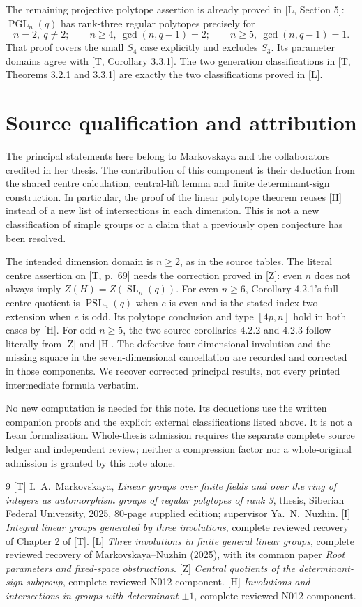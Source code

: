 \documentclass[11pt,a4paper]{article}
\newcommand{\SL}{\operatorname{SL}}
\newcommand{\PGL}{\operatorname{PGL}}
\newcommand{\PSL}{\operatorname{PSL}}
\begin{document}
The remaining projective polytope assertion is already proved in
[L, Section 5]: $\PGL_n(q)$ has rank-three regular polytopes precisely
for
\[
 n=2,\ q\ne2;\qquad n\ge4,\ \gcd(n,q-1)=2;
 \qquad n\ge5,\ \gcd(n,q-1)=1.
\]
That proof covers the small $S_4$ case explicitly and excludes $S_3$.
Its parameter domains agree with [T, Corollary 3.3.1]. The two
generation classifications in [T, Theorems 3.2.1 and 3.3.1] are
exactly the two classifications proved in [L].

\section{Source qualification and attribution}
The principal statements here belong to Markovskaya and the
collaborators credited in her thesis. The contribution of this
component is their deduction from the shared centre calculation,
central-lift lemma and finite determinant-sign construction. In
particular, the proof of the linear polytope theorem reuses [H]
instead of a new list of intersections in each dimension. This is
not a new classification of simple groups or a claim that a previously
open conjecture has been resolved.

The intended dimension domain is $n\ge2$, as in the source tables.
The literal centre assertion on [T, p.~69] needs the correction
proved in [Z]: even $n$ does not always imply $Z(H)=Z(\SL_n(q))$.
For even $n\ge6$, Corollary 4.2.1's full-centre quotient is
$\PSL_n(q)$ when $e$ is even and is the stated index-two extension
when $e$ is odd. Its polytope conclusion and type $[4p,n]$ hold in
both cases by [H]. For odd $n\ge5$, the two source corollaries
4.2.2 and 4.2.3 follow literally from [Z] and [H]. The defective
four-dimensional involution and the missing square in the
seven-dimensional cancellation are recorded and corrected in those
components. We recover corrected principal results, not every
printed intermediate formula verbatim.

No new computation is needed for this note. Its deductions use the
written companion proofs and the explicit external classifications
listed above. It is not a Lean formalization. Whole-thesis admission
requires the separate complete source ledger and independent review;
neither a compression factor nor a whole-original admission is
granted by this note alone.

\begin{thebibliography}{9}\small
{}[T] I.~A.~Markovskaya, \emph{Linear groups over finite fields
and over the ring of integers as automorphism groups of regular
polytopes of rank 3}, thesis, Siberian Federal University, 2025,
80-page supplied edition; supervisor Ya.~N.~Nuzhin.
[I] \emph{Integral linear groups generated by three involutions},
complete reviewed recovery of Chapter 2 of [T].
[L] \emph{Three involutions in finite general linear groups},
complete reviewed recovery of Markovskaya--Nuzhin (2025), with its
common paper \emph{Root parameters and fixed-space obstructions}.
[Z] \emph{Central quotients of the determinant-sign subgroup},
complete reviewed N012 component.
[H] \emph{Involutions and intersections in groups with
determinant $\pm1$}, complete reviewed N012 component.
\end{thebibliography}
\end{document}
